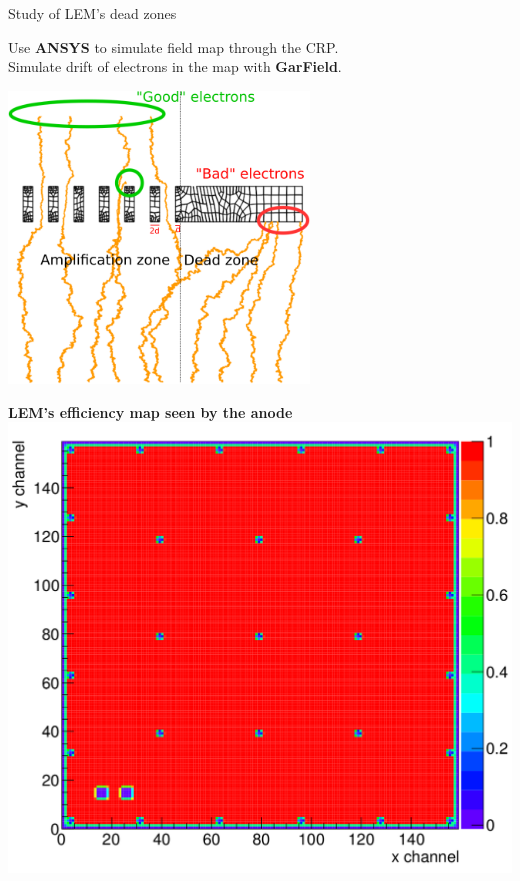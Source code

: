 \documentclass[10pt]{beamer}
\begin{document}
\begin{frame}{Study of LEM's dead zones}
\begin{scriptsize}
\begin{minipage}{0.38\textwidth}
    			Use \textbf{ANSYS} to simulate field map through the CRP.\\
    			Simulate drift of electrons in the map with \textbf{GarField}.\\
    		\end{minipage}
    		\begin{minipage}{0.58\textwidth}
    			\centering
    			\includegraphics[width=0.6\textwidth]{figures/666/drift_example.png}\\
    			\vspace{0.5cm} \hspace{0.1cm}
    			\begin{minipage}{0.48\textwidth}
    				\centering
    				\textbf{LEM's efficiency map seen by the anode}\\
    				\includegraphics[width=\textwidth]{figures/666/eff_map.png}

\end{minipage}
\end{minipage}
\end{scriptsize}
\end{frame}
\end{document}
